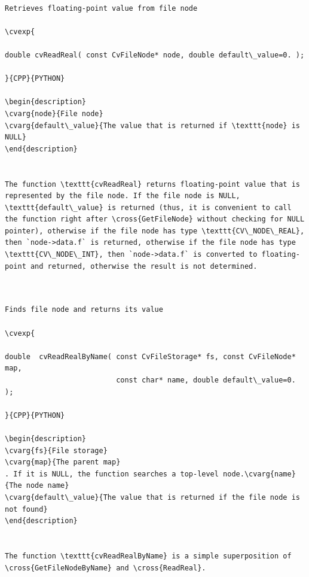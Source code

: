 \begin{verbatim}

Retrieves floating-point value from file node

\cvexp{

double cvReadReal( const CvFileNode* node, double default\_value=0. );

}{CPP}{PYTHON}

\begin{description}
\cvarg{node}{File node}
\cvarg{default\_value}{The value that is returned if \texttt{node} is NULL}
\end{description}


The function \texttt{cvReadReal} returns floating-point value that is represented by the file node. If the file node is NULL, \texttt{default\_value} is returned (thus, it is convenient to call the function right after \cross{GetFileNode} without checking for NULL pointer), otherwise if the file node has type \texttt{CV\_NODE\_REAL}, then `node->data.f` is returned, otherwise if the file node has type \texttt{CV\_NODE\_INT}, then `node->data.f` is converted to floating-point and returned, otherwise the result is not determined.


\end{verbatim}
\label{ReadRealByName}
\begin{verbatim}

Finds file node and returns its value

\cvexp{

double  cvReadRealByName( const CvFileStorage* fs, const CvFileNode* map,
                          const char* name, double default\_value=0. );

}{CPP}{PYTHON}

\begin{description}
\cvarg{fs}{File storage}
\cvarg{map}{The parent map}
. If it is NULL, the function searches a top-level node.\cvarg{name}{The node name}
\cvarg{default\_value}{The value that is returned if the file node is not found}
\end{description}


The function \texttt{cvReadRealByName} is a simple superposition of \cross{GetFileNodeByName} and \cross{ReadReal}.


\end{verbatim}
\label{ReadString}
